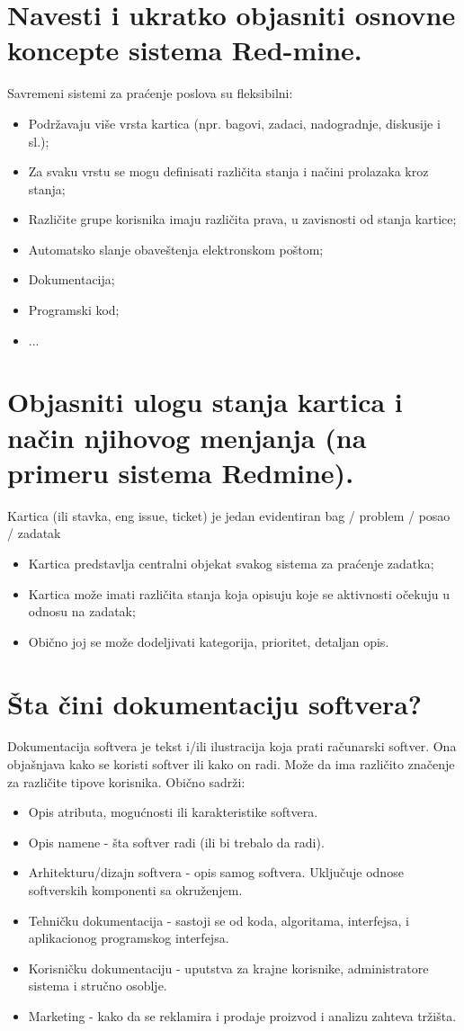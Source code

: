 \documentclass[a4paper]{article}
\begin{document}
\section{Navesti i ukratko objasniti osnovne koncepte sistema Red-mine.}
  Savremeni sistemi za praćenje poslova su fleksibilni:
  \begin{itemize}
    \item Podržavaju više vrsta kartica (npr. bagovi, zadaci, nadogradnje, diskusije i sl.);
    \item Za svaku vrstu se mogu definisati različita stanja i načini prolazaka kroz stanja;
    \item Različite grupe korisnika imaju različita prava, u zavisnosti od stanja kartice;
    \item Automatsko slanje obaveštenja elektronskom poštom;
    \item Dokumentacija;
    \item Programski kod;
    \item ...
  \end{itemize}
  
\section{Objasniti ulogu stanja kartica i način njihovog menjanja (na primeru sistema Redmine).}
  Kartica (ili stavka, eng issue, ticket) je jedan evidentiran bag / problem / posao / zadatak
  \begin{itemize}
      \item Kartica predstavlja centralni objekat svakog sistema za praćenje zadatka;
      \item Kartica može imati različita stanja koja opisuju koje se aktivnosti očekuju 
            u odnosu na zadatak;
      \item Obično joj se može dodeljivati kategorija, prioritet, detaljan opis.
  \end{itemize}
\section{Šta čini dokumentaciju softvera?}
  Dokumentacija softvera je tekst i/ili ilustracija koja prati računarski softver. 
  Ona objašnjava kako se koristi softver ili kako on radi. Može da ima različito značenje za 
  različite tipove korisnika.
  Obično sadrži:
  \begin{itemize}
    \item Opis atributa, mogućnosti ili karakteristike softvera.
    \item Opis namene - šta softver radi (ili bi trebalo da radi).
    \item Arhitekturu/dizajn softvera - opis samog softvera. Uključuje odnose 
          softverskih komponenti sa okruženjem.
    \item Tehničku dokumentacija - sastoji se od koda, algoritama, interfejsa, i 
          aplikacionog programskog interfejsa.
    \item Korisničku dokumentaciju - uputstva za krajne korisnike, administratore sistema i 
          stručno osoblje.
    \item Marketing - kako da se reklamira i prodaje proizvod i analizu zahteva tržišta.
  \end{itemize}
\end{document}

